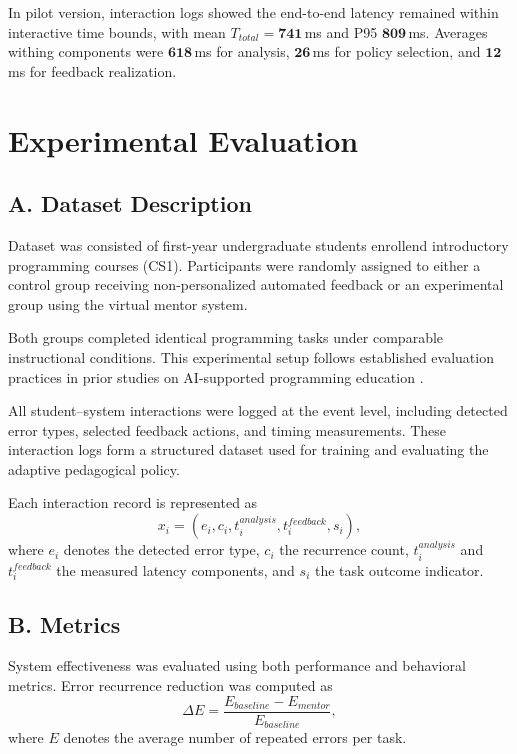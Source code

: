 \documentclass[conference]{IEEEtran}
\begin{document}
In pilot version, interaction logs showed the end-to-end latency remained within interactive time bounds,
with mean $T_{total}=\textbf{741}$\,ms and P95 $\textbf{809}$\,ms. Averages withing components were
$\textbf{618}$\,ms for analysis, $\textbf{26}$\,ms for policy selection, and $\textbf{12}$\,ms for feedback realization.




\section{Experimental Evaluation}\label{sec:evaluation}

\subsection*{A. Dataset Description}

Dataset was consisted of first-year undergraduate students enrollend introductory programming courses (CS1). Participants were randomly assigned to either a control group receiving non-personalized automated feedback or an experimental group using the virtual mentor system.

Both groups completed identical programming tasks under comparable instructional conditions. This experimental setup follows established evaluation practices in prior studies on AI-supported programming education \cite{FeasibilityStudyofAugmentingTeachingAssistantswithAI,IRIS}.

All student–system interactions were logged at the event level, including detected error types, selected feedback actions, and timing measurements. These interaction logs form a structured dataset used for training and evaluating the adaptive pedagogical policy.

Each interaction record is represented as
\[
x_i = (e_i, c_i, t^{analysis}_i, t^{feedback}_i, s_i),
\]
where $e_i$ denotes the detected error type, $c_i$ the recurrence count, $t^{analysis}_i$ and $t^{feedback}_i$ the measured latency components, and $s_i$ the task outcome indicator.


\subsection*{B. Metrics}

System effectiveness was evaluated using both performance and behavioral metrics. Error recurrence reduction was computed as
\[
\Delta E = \frac{E_{baseline} - E_{mentor}}{E_{baseline}},
\]
where $E$ denotes the average number of repeated errors per task.
\end{document}
